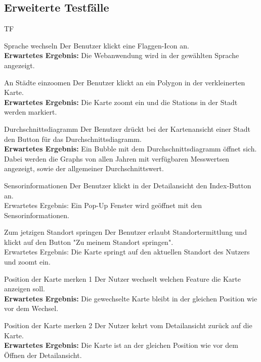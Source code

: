 \subsection{Erweiterte Testfälle}
\begin{Kriterien}{TF}
	
	\item[Sprache wechseln] Der Benutzer klickt eine Flaggen-Icon an. \\ \textbf{Erwartetes Ergebnis:} Die Webanwendung wird in der gewählten Sprache angezeigt.
	
	\item[An Städte einzoomen] Der Benutzer klickt an ein Polygon in der verkleinerten Karte. \\ \textbf{Erwartetes Ergebnis:} Die Karte zoomt ein und die \glspl{Station} in der Stadt werden markiert.
	
	\item[Durchschnittsdiagramm] Der Benutzer drückt bei der Kartenansicht einer Stadt den Button für das Durchschnittsdiagramm. \\ \textbf{Erwartetes Ergebnis:} Ein Bubble mit dem Durchschnittsdiagramm öffnet sich. Dabei werden die \glspl{Graph} von allen Jahren mit verfügbaren \glspl{Messwert}en angezeigt, sowie der allgemeiner Durchschnittswert.
	
	\item[Sensorinformationen] Der Benutzer klickt in der Detailansicht den Index-Button an. \\ Erwartetes Ergebnis: Ein Pop-Up Fenster
wird geöffnet mit den Sensorinformationen.

	\item[Zum jetzigen Standort springen] Der Benutzer erlaubt Standortermittlung und klickt auf den Button "Zu meinem Standort springen". \\ Erwartetes Ergebnis: Die Karte springt auf den aktuellen Standort des Nutzers und zoomt ein.
	
	\item[Position der Karte merken 1] Der Nutzer wechselt welchen Feature die Karte anzeigen soll. \\ 
	\textbf{Erwartetes Ergebnis:} Die gewechselte Karte bleibt in der gleichen Position wie vor dem Wechsel.
	
	\item[Position der Karte merken 2] Der Nutzer kehrt vom Detailansicht zurück auf die Karte. \\ 
	\textbf{Erwartetes Ergebnis:} Die Karte ist an der gleichen Position wie vor dem Öffnen der Detailansicht.
	
\end{Kriterien}
